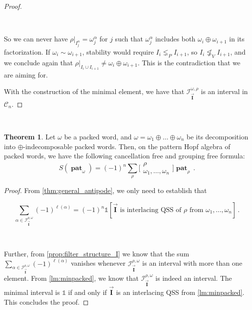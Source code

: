 \documentclass[12pt, reqno]{amsart}
\theoremstyle{definition}
\newtheorem{thm}{Theorem}[section]
\newcommand{\III}{\vec{\mathbf{I}}}
\DeclareMathOperator{\pat}{\mathbf{pat}}
\begin{document}
\begin{proof}
\begin{itemize}
\

So we can never have $\rho|_{I^{\alpha}_j} = \omega^{\alpha}_j$ for $j$ such that $\omega^{\alpha}_j$ includes both $\omega_i \oplus \omega_{i+1}$ in its factorization.
If $\omega_i \sim \omega_{i+1}$, stability would require $I_i \lneq_P I_{i+1}$, so $I_i \not\lneq_V I_{i+1}$, and we conclude again that $\rho|_{I_i \cup I_{i+1}} \neq \omega_i \oplus \omega_{i+1}$.
This is the contradiction that we are aiming for.
\end{itemize}
With the construction of the minimal element, we have that $\mathcal I^{\omega, \rho}_{\III}$ is an interval in $\mathcal{C}_n$.
\end{proof}

\

\begin{thm}\label{thm:antipode_packed}
Let $\omega $ be a packed word, and $\omega = \omega_1 \oplus \dots \oplus \omega_n$ be its decomposition into $\oplus$-indecomposable packed words.
Then, on the pattern Hopf algebra of packed words, we have the following cancellation free and grouping free formula:
$$S(\pat_{\omega}) = (-1)^n  \sum_{\rho} \bigl[\!\begin{smallmatrix} \rho  \\ \omega_1, \dots, \omega_n \end{smallmatrix}\!\bigr] \pat_{\rho}  \, .$$
\end{thm}


\begin{proof}
From \cref{thm:general_antipode}, we only need to establish that

\begin{equation}\label{eq:packed_alternating_sum}
\sum_{\alpha\in \mathcal I^{\rho, \omega}_{\III}} (-1)^{\ell (\alpha)} = (-1)^n \mathbb{1}[\III \text{ is interlacing QSS of $\rho$ from } \omega_1, \dots, \omega_n]\, .      
\end{equation}

\

Further, from \cref{prop:filter_structure_I} we know that the sum $\sum_{\alpha\in \mathcal I^{\rho, \omega}_{\III}}  (-1)^{\ell (\alpha)} $ vanishes whenever $\mathcal I^{\rho, \omega}_{\III}$ is an interval with more than one element.
From \cref{lm:minpacked}, we know that $\mathcal I^{\rho, \omega}_{\III}$ is indeed an interval.
The minimal interval is $\mathbb{1}$ if and only if $\III$ is an interlacing QSS from \cref{lm:minpacked}.
This concludes the proof.
\end{proof}
\end{document}
